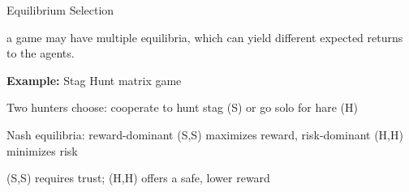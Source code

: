 \begin{frame}{Equilibrium Selection}

 a game may have multiple equilibria, which can yield different expected returns to the agents.
\vspace{5pt}

\bcol
        \blist
            \item<1-> {\bf Example:} Stag Hunt matrix game
            \item<1-> Two hunters choose: cooperate to hunt stag (S) or go solo for hare (H)
            \item<2-> Nash equilibria: reward-dominant (S,S) maximizes reward, risk-dominant (H,H) minimizes risk
            \item<3-> (S,S) requires trust; (H,H) offers a safe, lower reward
        \elist

        \centering
        \gamestaghunt
		\vspace{10pt}

\ecol
    
\end{frame}


